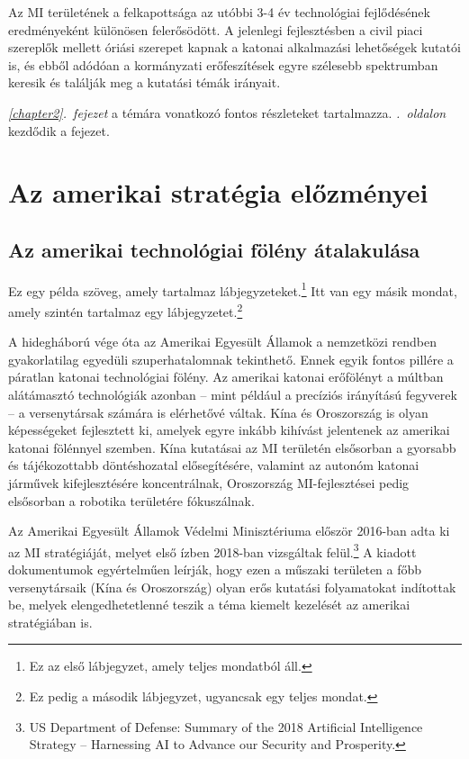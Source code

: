 \documentclass[
]{thesis-ekf}
\theoremstyle{definition}
\theoremstyle{remark}
\begin{document}
	Az MI területének a felkapottsága az utóbbi 3-4 év technológiai fejlődésének eredményeként különösen felerősödött. A jelenlegi fejlesztésben a civil piaci szereplők mellett óriási szerepet kapnak a katonai alkalmazási lehetőségek kutatói is, és ebből adódóan  a kormányzati erőfeszítések egyre szélesebb spektrumban keresik és találják meg a kutatási témák irányait.
	
	\Az \emph{\ref{chapter2}.~fejezet} a témára vonatkozó fontos  részleteket tartalmazza.
	\Az \emph{\pageref{chapter2}.~oldalon} kezdődik a fejezet.
	
	\chapter{Az amerikai stratégia előzményei}
	\section{Az amerikai technológiai fölény átalakulása}
	
	Ez egy példa szöveg, amely tartalmaz lábjegyzeteket.\footnote{Ez az első lábjegyzet, amely teljes mondatból áll.}
	Itt van egy másik mondat, amely szintén tartalmaz egy lábjegyzetet.\footnote{Ez pedig a második lábjegyzet, ugyancsak egy teljes mondat.}
	
	A hidegháború vége óta az Amerikai Egyesült Államok a nemzet\-közi rendben gyakorlatilag egyedüli szuperhatalomnak tekinthető. Ennek egyik fontos pillére a páratlan katonai technológiai fölény. Az amerikai katonai erőfölényt a múltban alátámasztó technológiák azonban -- mint például a precíziós irányítású fegyverek -- a versenytársak számára is elérhetővé váltak. Kína és Oroszország is olyan képességeket fejlesztett ki, amelyek egyre inkább kihívást jelentenek az amerikai katonai fölénnyel szemben. Kína kutatásai az MI területén elsősorban a gyorsabb és tájékozottabb döntéshozatal elősegítésére, valamint az autonóm katonai járművek kifejlesztésére koncentrálnak, Oroszország MI-fejlesztései pedig elsősorban a robotika területére fókuszálnak.

	Az Amerikai Egyesült Államok Védelmi Minisztériuma először 2016-ban adta ki az MI stratégiáját, melyet első ízben 2018-ban vizsgáltak felül.\footnote{US Department of Defense: Summary of the 2018 Artificial Intelligence Strategy – Harnessing AI to Advance our Security and Prosperity.} A kiadott dokumentumok egyértelműen leírják, hogy ezen a műszaki területen a főbb versenytársaik (Kína és Oroszország) olyan erős kutatási folyamatokat indítottak be, melyek elengedhetetlenné teszik a téma kiemelt kezelését az amerikai stratégiában is.
\end{document}
